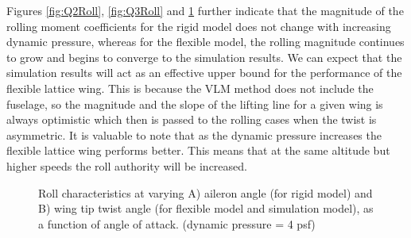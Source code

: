 \documentclass[11pt]{ucthesis}
\begin{document}
Figures \ref{fig:Q2Roll}, \ref{fig:Q3Roll} and \ref{fig:Q4Roll} further indicate that the magnitude of the rolling moment coefficients for the rigid model does not change with increasing dynamic pressure, whereas for the flexible model, the rolling magnitude continues to grow and begins to converge to the simulation results. We can expect that the simulation results will act as an effective upper bound for the performance of the flexible lattice wing. This is because the VLM method does not include the fuselage, so the magnitude and the slope of the lifting line for a given wing is always optimistic which then is passed to the rolling cases when the twist is asymmetric. It is valuable to note that as the dynamic pressure increases the flexible lattice wing performs better. This means that at the same altitude but higher speeds the roll authority will be increased.

\begin{figure}[thpb]
\hfill
{}
\hfill
{}
\hfill
\caption{Roll characteristics at varying A) aileron angle (for rigid model) and B) wing tip twist angle (for flexible model and simulation model), as a function of angle of attack. (dynamic pressure = 4 psf)}
\label{fig:Q4Roll}
\end{figure}
\end{document}
